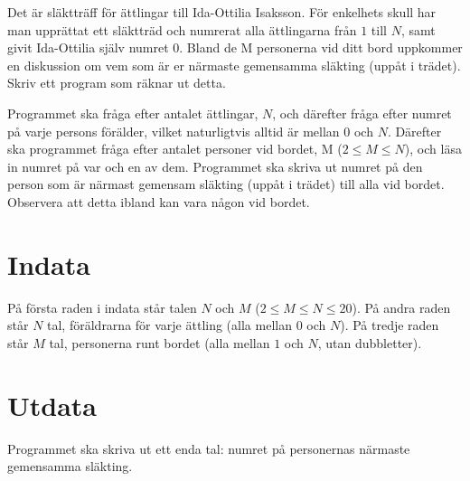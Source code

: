 Det är släktträff för ättlingar till Ida-Ottilia Isaksson.
För enkelhets skull har man upprättat ett släktträd och numrerat alla ättlingarna från $1$ till $N$, samt givit Ida-Ottilia själv numret $0$.
Bland de M personerna vid ditt bord uppkommer en diskussion om vem som är er närmaste gemensamma släkting (uppåt i trädet).
Skriv ett program som räknar ut detta.

Programmet ska fråga efter antalet ättlingar, $N$, och därefter fråga efter numret på varje persons förälder, vilket naturligtvis alltid är mellan $0$ och $N$.
Därefter ska programmet fråga efter antalet personer vid bordet, M ($2 \le M \le N$), och läsa in numret på var och en av dem.
Programmet ska skriva ut numret på den person som är närmast gemensam släkting (uppåt i trädet) till alla vid bordet.
Observera att detta ibland kan vara någon vid bordet.

\section*{Indata}
På första raden i indata står talen $N$ och $M$ ($2 \le M \le N \le 20$).
På andra raden står $N$ tal, föräldrarna för varje ättling (alla mellan $0$ och $N$).
På tredje raden står $M$ tal, personerna runt bordet (alla mellan $1$ och $N$, utan dubbletter).

\section*{Utdata}
Programmet ska skriva ut ett enda tal: numret på personernas närmaste gemensamma släkting.
